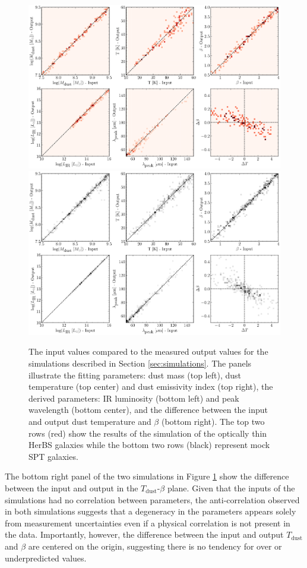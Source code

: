 \begin{figure}
	\centering
	\includegraphics[width=0.75\columnwidth]{Figures/in_out_simulations_herbs_ot_detected.pdf}
	\includegraphics[width=0.75\columnwidth]{Figures/in_out_simulations_spt_ot_detected.pdf}
	\caption{The input values compared to the measured output values for the simulations described in Section \ref{sec:simulations}. The panels illustrate the fitting parameters: dust mass (top left), dust temperature (top center) and dust emissivity index (top right), the derived parameters: IR luminosity (bottom left) and peak wavelength (bottom center), and the difference between the input and output dust temperature and $\beta$ (bottom right). The top two rows (red) show the results of the simulation of the optically thin HerBS galaxies while the bottom two rows (black) represent mock SPT galaxies.}
	\label{fig:in_out_simulations}
\end{figure}

The bottom right panel of the two simulations in Figure \ref{fig:in_out_simulations} show the difference between the input and output in the $T_{\textrm{dust}}$-$\beta$ plane. Given that the inputs of the simulations had no correlation between parameters, the anti-correlation observed in both simulations suggests that a degeneracy in the parameters appears solely from measurement uncertainties even if a physical correlation is not present in the data. Importantly, however, the difference between the input and output $T_{\textrm{dust}}$ and $\beta$ are centered on the origin, suggesting there is no tendency for over or underpredicted values.

